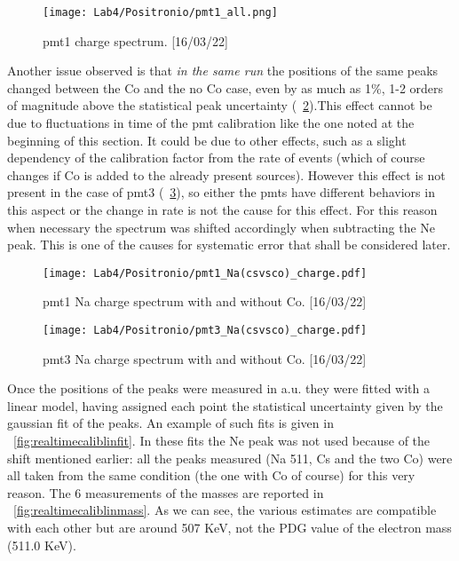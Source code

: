 \documentclass[10pt,a4paper,twocolumn]{article}
\begin{document}
\begin{figure}[h!]
\centering
\texttt{[image: Lab4/Positronio/pmt1\_all.png]} 
\caption{pmt1 charge spectrum. [16/03/22]}
\label{fig:realtimecalib}
\end{figure}

Another issue observed is that \textit{in the same run} the positions of the same peaks changed between the Co and the no Co case, even by as much as 1\%, 1-2 orders of magnitude above the statistical peak uncertainty (\figurename~\ref{fig:intrarundiscrepancy}).This effect cannot be due to fluctuations in time of the pmt calibration like the one noted at the beginning of this section. It could be due to other effects, such as a slight dependency of the calibration factor from the rate of events (which of course changes if Co is added to the already present sources). However this effect is not present in the case of pmt3 (\figurename~\ref{fig:pmt3norundiscrepancy}), so either the pmts have different behaviors in this aspect or the change in rate is not the cause for this effect. For this reason when necessary the spectrum was shifted accordingly when subtracting the Ne peak. This is one of the causes for systematic error that shall be considered later.

\begin{figure}[h!]
\centering
\texttt{[image: Lab4/Positronio/pmt1\_Na(csvsco)\_charge.pdf]} 
\caption{pmt1 Na charge spectrum with and without Co. [16/03/22]}
\label{fig:intrarundiscrepancy}
\end{figure}

\begin{figure}[h!]
\centering
\texttt{[image: Lab4/Positronio/pmt3\_Na(csvsco)\_charge.pdf]} 
\caption{pmt3 Na charge spectrum with and without Co. [16/03/22]}
\label{fig:pmt3norundiscrepancy}
\end{figure}

\noindent Once the positions of the peaks were measured in a.u. they were fitted with a linear model, having assigned each point the statistical uncertainty given by the gaussian fit of the peaks.  An example of such fits is given in \figurename~\ref{fig:realtimecaliblinfit}.
In these fits the Ne peak was not used because of the shift mentioned earlier: all the peaks measured (Na 511, Cs and the two Co) were all taken from the same condition (the one with Co of course) for this very reason.
The 6 measurements of the masses are reported in \figurename~\ref{fig:realtimecaliblinmass}. As we can see, the various estimates are compatible with each other but are around 507 KeV, not the PDG value of the electron mass (511.0 KeV).
\end{document}
